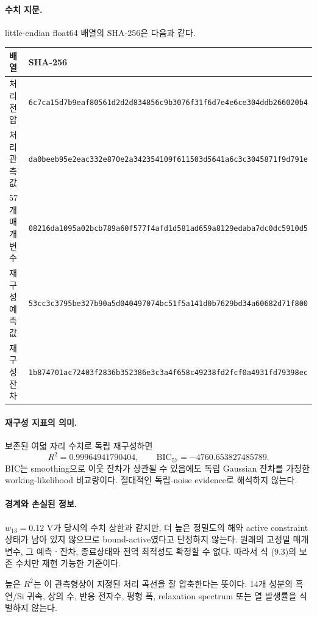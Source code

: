 \paragraph{ 수치 지문.}
little-endian float64 배열의 SHA-256은 다음과 같다.
\begin{center}
\scriptsize
\begin{tabularx}{\textwidth}{>{\raggedright\arraybackslash}p{}X}
\toprule
배열 & SHA-256\\
\midrule
처리 전압 &
\texttt{6c7ca15d7b9eaf80561d2d2d834856c9b3076f31f6d7e4e6ce304ddb266020b4}\\
처리 관측값 &
\texttt{da0beeb95e2eac332e870e2a342354109f611503d5641a6c3c3045871f9d791e}\\
57개 매개변수 &
\texttt{08216da1095a02bcb789a60f577f4afd1d581ad659a8129edaba7dc0dc5910d5}\\
재구성 예측값 &
\texttt{53cc3c3795be327b90a5d040497074bc51f5a141d0b7629bd34a60682d71f800}\\
재구성 잔차 &
\texttt{1b874701ac72403f2836b352386e3c3a4f658c49238fd2fcf0a4931fd79398ec}\\
\bottomrule
\end{tabularx}
\end{center}

\paragraph{ 재구성 지표의 의미.}
보존된 여덟 자리 수치로 독립 재구성하면
\[
R^2=0.99964941790404,\qquad
\mathrm{BIC}_{57}=-4760.653827485789 .
\tag{9.5}
\]
BIC는 smoothing으로 이웃 잔차가 상관될 수 있음에도 독립
Gaussian 잔차를 가정한 working-likelihood 비교량이다. 절대적인
독립-noise evidence로 해석하지 않는다.

\paragraph{ 경계와 손실된 정보.}
$w_{13}=0.12$ V가 당시의 수치 상한과 같지만, 더 높은 정밀도의
해와 active constraint 상태가 남아 있지 않으므로 bound-active였다고
단정하지 않는다. 원래의 고정밀 매개변수, 그 예측ㆍ잔차,
종료상태와 전역 최적성도 확정할 수 없다. 따라서 식 (9.3)의
보존 수치만 재현 가능한 기준이다.

\begin{identifiability}
높은 $R^2$는 이 관측형상이 지정된 처리 곡선을 잘 압축한다는
뜻이다. 14개 성분의 흑연/Si 귀속, 상의 수, 반응 전자수,
평형 폭, relaxation spectrum 또는 열 발생률을 식별하지 않는다.
\end{identifiability}
